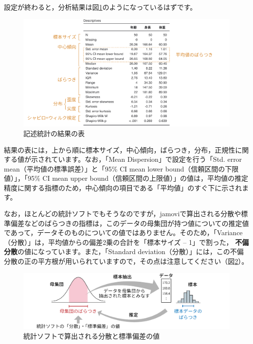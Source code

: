 \documentclass[
  12pt,
  a5jpaper,
  lualatex, ja=standard]{bxjsbook}
\renewcommand{\emph}[1]{\textbf{\color{emph} #1}}
\begin{document}
設定が終わると，分析結果は図\ref{fig:Exploration-descriptives-continuous-table}のようになっているはずです。

\begin{figure}[!ht]

{\centering \includegraphics[width=1\linewidth]{images/exploration/Exploration-descriptives-continuous-table} 

}

\caption{記述統計の結果の表}\label{fig:Exploration-descriptives-continuous-table}
\end{figure}

結果の表には，上から順に標本サイズ，中心傾向，ばらつき，分布，正規性に関する値が示されています。なお，「Mean Dispersion」で設定を行う「Std. error mean（平均値の標準誤差）」と「95\% CI mean lower bound（信頼区間の下限値）」，「95\% CI mean upper bound（信頼区間の上限値）」の値は，平均値の推定精度に関する指標のため，中心傾向の項目である「平均値」のすぐ下に示されます。

なお，ほとんどの統計ソフトでもそうなのですが，jamoviで算出される分散や標準偏差などのばらつきの指標は，このデータの母集団が持つ値についての推定値であって，データそのものについての値ではありません。そのため，「Variance（分散）」は，平均値からの偏差2乗の合計を「標本サイズ -- 1」で割った，\emph{不偏分散}の値になっています。また，「Standard deviation（分散）」には，この不偏分散の正の平方根が用いられていますので，その点は注意してください（図\ref{fig:exp-dispersion}）。

\begin{figure}[!ht]

{\centering \includegraphics[width=1\linewidth]{images/exploration/dispersion} 

}

\caption{統計ソフトで算出される分散と標準偏差の値}\label{fig:exp-dispersion}
\end{figure}
\end{document}
